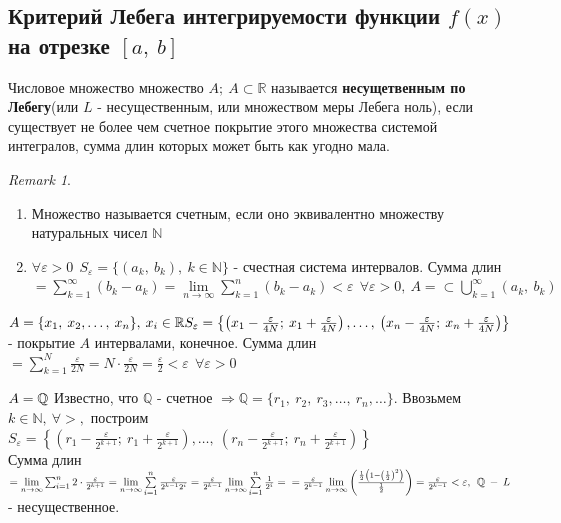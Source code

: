 \documentclass[a4paper,12pt, centered]{bookest}
\theoremstyle{remark}
\newtheorem*{remark}{Remark}
\begin{document}
\subsection{Критерий Лебега интегрируемости функции $f(x)$ на отрезке $[a,\>b]$}
Числовое множество множество $A;\>A\subset\mathbb{R}$ называется \textbf{несущетвенным по Лебегу}(или $L$ - несущественным, или множеством меры Лебега ноль), если существует не более чем счетное покрытие этого множества системой интегралов, сумма длин которых может быть как угодно мала. 
\begin{remark}$ $
	\begin{enumerate}
		\item Множество называется счетным, если оно эквивалентно множеству натуральных чисел $\mathbb{N}$ 
		\item $\forall \varepsilon>0\>\>S_\varepsilon=\{(a_k,\>b_k),\>k\in\mathbb{N}\}$ - счестная система интервалов. Сумма длин $=\sum\limits_{k=1}^\infty(b_k-a_k)=\lim\limits_{n\to\infty}\sum\limits_{k=1}^n(b_k-a_k)<\varepsilon\>\>\forall\varepsilon>0,\>A=\subset\bigcup\limits_{k=1}^{\infty}(a_k,\>b_k)$
	\end{enumerate}
\end{remark}
\begin{example}
	$A=\{x_1,\>x_2,\dots,\>x_n\},\>x_i\in\mathbb{R}\\S_\varepsilon=\left\{\left(x_1-\frac{\varepsilon}{4N};\>x_1+\frac{\varepsilon}{4N}\right),\dots,\>\left(x_n-\frac{\varepsilon}{4N};\>x_n+\frac{\varepsilon}{4N}\right)\right\}$ - покрытие $A$ интервалами, конечное. Сумма длин $=\sum\limits_{k=1}^N\frac{\varepsilon}{2N}=N\cdot\frac\varepsilon{2N}=\frac\varepsilon2<\varepsilon\>\>\forall\varepsilon>0$
\end{example}
\begin{example}
	$A=\mathbb{Q}\\$ Известно, что $\mathbb{Q}$ - счетное $\Rightarrow\mathbb{Q}=\{r_1,\>r_2,\>r_3,\dots,\>r_n,\dots\}.$ Ввозьмем $k\in\mathbb{N},\>\forall>,$ построим $S_\varepsilon=\left\{\left(r_1-\frac\varepsilon{2^{k+1}};\>r_1+\frac\varepsilon{2^{k+1}}\right),\dots,\>\left(r_n-\frac\varepsilon{2^{k+1}};\>r_n+\frac\varepsilon{2^{k+1}}\right)\right\}$ \\ Сумма длин $=\lim\limits_{n\to\infty}\sum_{i=1}^n2\cdot\frac{\varepsilon}{2^{k+1}}=\lim\limits_{n\to\infty}\sum\limits_{i=1}^n\frac\varepsilon{2^{k-1}2^i}=\frac\varepsilon{2^{k-1}}\lim\limits_{n\to\infty}\sum\limits_{i=1}^n\frac1{2^i}=\\=\frac\varepsilon{2^{k-1}}\lim\limits_{n\to\infty}\left(\frac{\frac12\left(1-\left(\frac12\right)^2\right)}{\frac12}\right)=\frac\varepsilon{2^{k-1}}<\varepsilon,\>\>\mathbb{Q}\>-\>L$ - несущественное.
\end{example}
\end{document}
